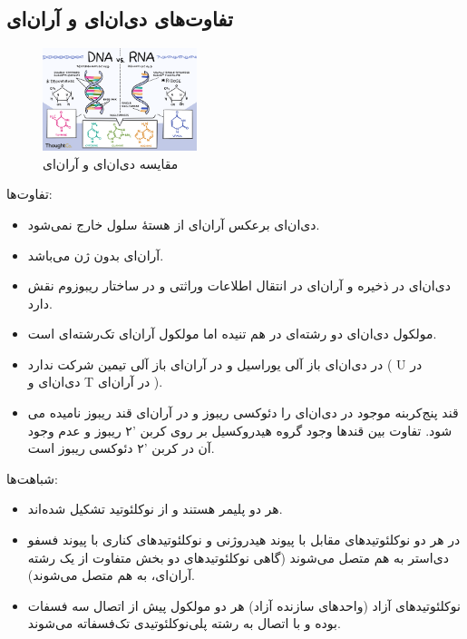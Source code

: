 \documentclass[12pt,a4paper,BCOR=.7cm,headsepline,bibliography=totoc]{report}
\begin{document}
\subsection{تفاوت‌های دی‌ان‌ای و آران‌ای}
\begin{figure}
\centering
\vspace{-45pt}
\includegraphics[width=0.4\textwidth]{pictures/dnarna.png}
\caption{
مقایسه دی‌ان‌ای و آران‌ای \cite{graph2}
}\label{wrap-fig:3}
\end{figure}
تفاوت‌ها:
\begin{itemize}
\item دی‌ان‌ای برعکس آر‌ان‌ای از هستهٔ سلول خارج نمی‌شود.
\item آر‌ان‌ای بدون ژن می‌باشد.
\item دی‌ان‌ای در ذخیره و آر‌ان‌ای در انتقال اطلاعات وراثتی و در ساختار ریبوزوم نقش دارد.
\item مولکول دی‌ان‌ای دو رشته‌ای در هم تنیده اما مولکول آر‌ان‌ای تک‌رشته‌ای است.
\end{itemize}
\newpage
\begin{itemize}
\item 
در دی‌ان‌ای باز آلی یوراسیل و در آر‌ان‌ای باز آلی تیمین شرکت ندارد ( U در دی‌ان‌ای و T در آر‌ان‌ای ).
\item
قند پنج‌کربنه موجود در دی‌ان‌ای را دئوکسی ریبوز و در آر‌ان‌ای قند ریبوز نامیده می شود. تفاوت بین قندها وجود گروه هیدروکسیل بر روی کربن '۲ ریبوز و عدم وجود آن در کربن '۲ دئوکسی ریبوز است.

\end{itemize}
شباهت‌ها:
\begin{itemize}
\item هر دو پلیمر هستند و از نوکلئوتید تشکیل شده‌اند.
\item در هر دو نوکلئوتیدهای مقابل با پیوند هیدروژنی و نوکلئوتیدهای کناری با پیوند فسفو دی‌استر به هم متصل می‌شوند (گاهی نوکلئوتیدهای دو بخش متفاوت از یک رشته آران‌ای، به هم متصل می‌شوند).
\item نوکلئوتیدهای آزاد (واحدهای سازنده آزاد) هر دو مولکول پیش از اتصال سه فسفات بوده و با اتصال به رشته پلی‌نوکلئوتیدی تک‌فسفاته می‌شوند.

\end{itemize}
\end{document}
